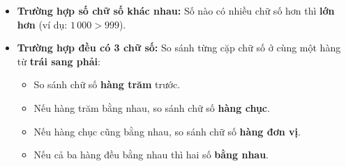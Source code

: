 \documentclass[10pt,a4paper]{article}
\begin{document}
\noindent
\begin{minipage}[t]{0.49\textwidth}\vspace{0pt}
\begin{tcolorbox}[
  enhanced,
  colback=violet!4!white,
  colframe=violet!75!black,
  arc=2mm, boxrule=0.8pt,
  left=2mm, right=2mm, top=1.8mm, bottom=1.8mm,
  title={\footnotesize\bfseries\color{white}\faKey\ 1. Quy tắc so sánh tổng quát}
]
{\footnotesize
\begin{itemize}\setlength{\itemsep}{1pt}\setlength{\leftskip}{-2.5mm}
  \item \textbf{Trường hợp số chữ số khác nhau:} Số nào có nhiều chữ số hơn thì \textbf{lớn hơn} (ví dụ: $1\,000 > 999$).
  \item \textbf{Trường hợp đều có 3 chữ số:} So sánh từng cặp chữ số ở cùng một hàng từ \textbf{trái sang phải}:
  \begin{itemize}\setlength{\itemsep}{0.5pt}\setlength{\leftskip}{-2mm}
    \item So sánh chữ số \textbf{hàng trăm} trước.
    \item Nếu hàng trăm bằng nhau, so sánh chữ số \textbf{hàng chục}.
    \item Nếu hàng chục cũng bằng nhau, so sánh chữ số \textbf{hàng đơn vị}.
    \item Nếu cả ba hàng đều bằng nhau thì hai số \textbf{bằng nhau}.
  \end{itemize}
\end{itemize}
}
\end{tcolorbox}
\end{minipage}
\hfill
\end{document}
